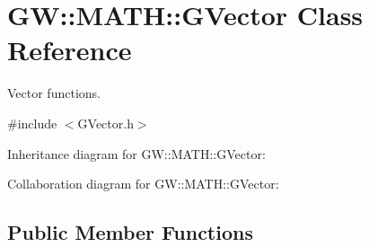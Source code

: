 \hypertarget{classGW_1_1MATH_1_1GVector}{}\section{GW\+::M\+A\+TH\+::G\+Vector Class Reference}
\label{classGW_1_1MATH_1_1GVector}


Vector functions.  




{\ttfamily \#include $<$G\+Vector.\+h$>$}



Inheritance diagram for GW\+::M\+A\+TH\+::G\+Vector\+:


Collaboration diagram for GW\+::M\+A\+TH\+::G\+Vector\+:
\subsection*{Public Member Functions}
